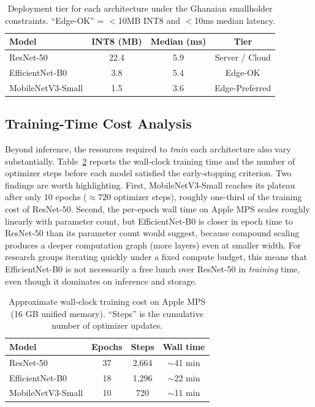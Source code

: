 \documentclass[conference,10pt]{IEEEtran}
\begin{document}
\begin{table}[t]
\centering
\caption{Deployment tier for each architecture under the Ghanaian smallholder
constraints. ``Edge-OK'' = $<$10MB INT8 and $<$10ms median latency.}
\label{tab:deploy}
\renewcommand{\arraystretch}{1.15}
\begin{tabular}{lccc}
\toprule
\textbf{Model} & \textbf{INT8 (MB)} & \textbf{Median (ms)} & \textbf{Tier} \\
\midrule
ResNet-50          & 22.4 & 5.9 & Server / Cloud \\
EfficientNet-B0    &  3.8 & 5.4 & Edge-OK \\
MobileNetV3-Small  &  1.5 & 3.6 & Edge-Preferred \\
\bottomrule
\end{tabular}
\end{table}

\subsection{Training-Time Cost Analysis}

Beyond inference, the resources required to \emph{train} each architecture
also vary substantially. Table~\ref{tab:traintime} reports the wall-clock
training time and the number of optimizer steps before each model satisfied
the early-stopping criterion. Two findings are worth highlighting. First,
MobileNetV3-Small reaches its plateau after only 10 epochs ($\approx 720$
optimizer steps), roughly one-third of the training cost of ResNet-50.
Second, the per-epoch wall time on Apple MPS scales roughly linearly with
parameter count, but EfficientNet-B0 is closer in epoch time to ResNet-50
than its parameter count would suggest, because compound scaling produces a
deeper computation graph (more layers) even at smaller width. For research
groups iterating quickly under a fixed compute budget, this means that
EfficientNet-B0 is not necessarily a free lunch over ResNet-50 in
\emph{training} time, even though it dominates on inference and storage.

\begin{table}[t]
\centering
\caption{Approximate wall-clock training cost on Apple MPS (16 GB unified
memory). ``Steps'' is the cumulative number of optimizer updates.}
\label{tab:traintime}
\renewcommand{\arraystretch}{1.15}
\begin{tabular}{lccc}
\toprule
\textbf{Model} & \textbf{Epochs} & \textbf{Steps} & \textbf{Wall time} \\
\midrule
ResNet-50          & 37 & 2{,}664 & $\sim$41 min \\
EfficientNet-B0    & 18 & 1{,}296 & $\sim$22 min \\
MobileNetV3-Small  & 10 &   720   & $\sim$11 min \\
\bottomrule
\end{tabular}
\end{table}
\end{document}
